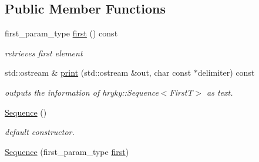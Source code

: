 \subsection*{Public Member Functions}
\begin{DoxyCompactItemize}
\item 
\hypertarget{classhryky_1_1_sequence_3_01_first_t_00_01hryky_1_1_sequence_null_01_4_a38ebed8babbffba283cb4d01697a27bf}{first\-\_\-param\-\_\-type \hyperlink{classhryky_1_1_sequence_3_01_first_t_00_01hryky_1_1_sequence_null_01_4_a38ebed8babbffba283cb4d01697a27bf}{first} () const }\label{classhryky_1_1_sequence_3_01_first_t_00_01hryky_1_1_sequence_null_01_4_a38ebed8babbffba283cb4d01697a27bf}

\begin{DoxyCompactList}\small\item\em retrieves first element \end{DoxyCompactList}\item 
\hypertarget{classhryky_1_1_sequence_3_01_first_t_00_01hryky_1_1_sequence_null_01_4_a41690541580a062c7e99cc48303e9dd9}{std\-::ostream \& \hyperlink{classhryky_1_1_sequence_3_01_first_t_00_01hryky_1_1_sequence_null_01_4_a41690541580a062c7e99cc48303e9dd9}{print} (std\-::ostream \&out, char const $\ast$delimiter) const }\label{classhryky_1_1_sequence_3_01_first_t_00_01hryky_1_1_sequence_null_01_4_a41690541580a062c7e99cc48303e9dd9}

\begin{DoxyCompactList}\small\item\em outputs the information of hryky\-::\-Sequence$<$\-First\-T$>$ as text. \end{DoxyCompactList}\item 
\hypertarget{classhryky_1_1_sequence_3_01_first_t_00_01hryky_1_1_sequence_null_01_4_ac9958f2e50ddbbc203c06cab18ca7956}{\hyperlink{classhryky_1_1_sequence_3_01_first_t_00_01hryky_1_1_sequence_null_01_4_ac9958f2e50ddbbc203c06cab18ca7956}{Sequence} ()}\label{classhryky_1_1_sequence_3_01_first_t_00_01hryky_1_1_sequence_null_01_4_ac9958f2e50ddbbc203c06cab18ca7956}

\begin{DoxyCompactList}\small\item\em default constructor. \end{DoxyCompactList}\item 
\hypertarget{classhryky_1_1_sequence_3_01_first_t_00_01hryky_1_1_sequence_null_01_4_af27ca62e371516d657fd34438b0e540c}{\hyperlink{classhryky_1_1_sequence_3_01_first_t_00_01hryky_1_1_sequence_null_01_4_af27ca62e371516d657fd34438b0e540c}{Sequence} (first\-\_\-param\-\_\-type \hyperlink{classhryky_1_1_sequence_3_01_first_t_00_01hryky_1_1_sequence_null_01_4_a38ebed8babbffba283cb4d01697a27bf}{first})}\label{classhryky_1_1_sequence_3_01_first_t_00_01hryky_1_1_sequence_null_01_4_af27ca62e371516d657fd34438b0e540c}


\end{DoxyCompactItemize}
